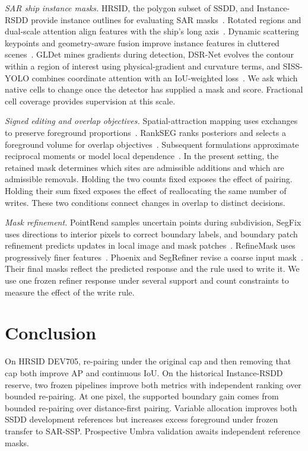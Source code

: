 \documentclass[journal]{IEEEtran}
\begin{document}
\textit{SAR ship instance masks.} HRSID, the polygon subset of SSDD, and Instance-RSDD provide instance outlines for evaluating SAR masks~\cite{hrsid,ssdd,rsdd}. Rotated regions and dual-scale attention align features with the ship's long axis~\cite{rsdd,drsnet}. Dynamic scattering keypoints and geometry-aware fusion improve instance features in cluttered scenes~\cite{gao2024,dacf,gcie}. GLDet mines gradients during detection, DSR-Net evolves the contour within a region of interest using physical-gradient and curvature terms, and SISS-YOLO combines coordinate attention with an IoU-weighted loss~\cite{gldet,dsr,siss}. We ask which native cells to change once the detector has supplied a mask and score. Fractional cell coverage provides supervision at this scale.

\textit{Signed editing and overlap objectives.} Spatial-attraction mapping uses exchanges to preserve foreground proportions~\cite{atkinson,xu}. RankSEG ranks posteriors and selects a foreground volume for overlap objectives~\cite{rankseg}. Subsequent formulations approximate reciprocal moments or model local dependence~\cite{rankrma,rankdep}. In the present setting, the retained mask determines which sites are admissible additions and which are admissible removals. Holding the two counts fixed exposes the effect of pairing. Holding their sum fixed exposes the effect of reallocating the same number of writes. These two conditions connect changes in overlap to distinct decisions.

\textit{Mask refinement.} PointRend samples uncertain points during subdivision, SegFix uses directions to interior pixels to correct boundary labels, and boundary patch refinement predicts updates in local image and mask patches~\cite{pointrend,segfix,bpr}. RefineMask uses progressively finer features~\cite{refinemask}. Phoenix and SegRefiner revise a coarse input mask~\cite{phoenix,segrefiner}. Their final masks reflect the predicted response and the rule used to write it. We use one frozen refiner response under several support and count constraints to measure the effect of the write rule.





\section{Conclusion}
On HRSID DEV705, re-pairing under the original cap and then removing that cap both improve AP and continuous IoU. On the historical Instance-RSDD reserve, two frozen pipelines improve both metrics with independent ranking over bounded re-pairing. At one pixel, the supported boundary gain comes from bounded re-pairing over distance-first pairing. Variable allocation improves both SSDD development references but increases excess foreground under frozen transfer to SAR-SSP. Prospective Umbra validation awaits independent reference masks.


\end{document}
